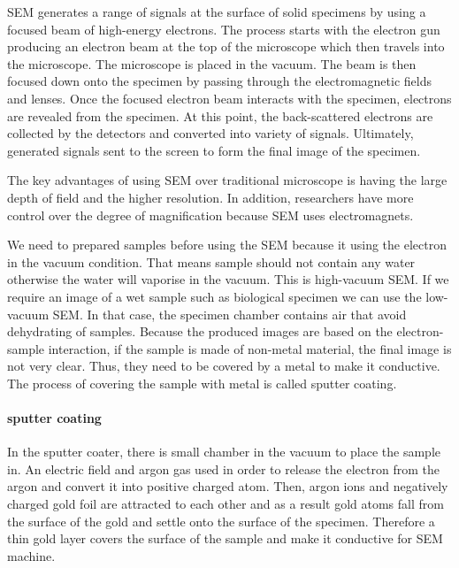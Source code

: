 \documentclass[12pt,a4paper,titlepage]{report}
\begin{document}
\ac*{SEM} generates a range of signals at the surface of solid specimens by using a focused beam
 of high-energy electrons. The process starts with the electron gun producing an electron beam 
at the top of the microscope which then travels into the microscope. The microscope is placed in the
 vacuum. The beam is then focused down onto the specimen by passing through the electromagnetic
 fields and lenses. Once the focused electron beam interacts with the specimen, electrons are revealed 
from the specimen. At this point, the back-scattered electrons are collected by the detectors and 
converted into variety of signals. Ultimately, generated signals sent to the screen to form the final image 
of the specimen\citep{Doe:2014Jan:Online}. 



The key advantages of using \ac*{SEM} over traditional microscope is having the large depth of
 field and the higher resolution. In addition, researchers have more control over the degree of 
magnification because \ac*{SEM} uses electromagnets\citep{Doe:2014Jan:Online}.

We need to prepared samples before using the \ac{SEM} because it using the electron in the
 vacuum condition. That means sample should not contain any water otherwise the water will 
vaporise in the vacuum. This is high-vacuum \ac*{SEM}. If we require an image of a wet sample such 
as biological specimen we can use the low-vacuum \ac*{SEM}. In that case, the specimen chamber
 contains air that avoid dehydrating of samples.
Because the produced images are based on the electron-sample interaction, if the sample is made
 of non-metal material, the final image is not very clear. Thus, they need to be covered by a metal to
 make it conductive. The process of covering the sample with metal is called sputter coating\citep{Doe:2014Jan:Online}.

\paragraph{sputter coating}
In the sputter coater, there is small chamber in the vacuum to place the sample in. An electric field 
and argon gas used in order to release the electron from the argon and convert it into positive charged 
atom. Then, argon ions and negatively charged gold foil are attracted to each other and as a result gold 
atoms fall from the surface of the gold and settle onto the surface of the specimen. Therefore a thin gold 
layer covers the surface of the sample and make it conductive for \ac*{SEM} machine\citep{Doe:2014Jan:Online}.
\end{document}
